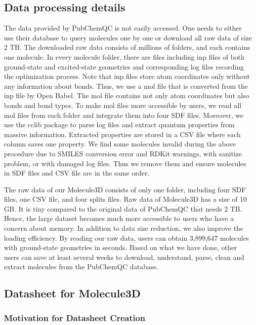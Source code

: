 \documentclass{article}
\begin{document}
\subsection{Data processing details} \label{sec:data_details}
The data provided by PubChemQC is not easily accessed. One needs to either use their database to query molecules one by one or download all raw data of size 2 TB. The downloaded raw data consists of millions of folders, and each contains one molecule. In every molecule folder, there are files including inp files of both ground-state and excited-state geometries and corresponding log files recording the optimization process. Note that inp files store atom coordinates only without any information about bonds. Thus, we use a mol file that is converted from the inp file by Open Babel. The mol file contains not only atom coordinates but also bonds and bond types. To make mol files more accessible by users, we read all mol files from each folder and integrate them into four SDF files. Moreover, we use the cclib package \cite{o2008cclib} to parse log files and extract quantum properties from massive information. Extracted properties are stored in a CSV file where each column saves one property. We find some molecules invalid during the above procedure due to SMILES conversion error and RDKit warnings, with sanitize problem, or with damaged log files. Thus we remove them and ensure molecules in SDF files and CSV file are in the same order.

The raw data of our Molecule3D consists of only one folder, including four SDF files, one CSV file, and four splits files. Raw data of Molecule3D has a size of 10 GB. It is tiny compared to the original data of PubChemQC that needs 2 TB. Hence, the large dataset becomes much more accessible to users who have a concern about memory. In addition to data size reduction, we also improve the loading efficiency. By reading our raw data, users can obtain 3,899,647 molecules with ground-state geometries in seconds. Based on what we have done, other users can save at least several weeks to download, understand, parse, clean and extract molecules from the PubChemQC database. 

\subsection{Datasheet for Molecule3D}

\subsubsection{Motivation for Datasheet Creation}
\end{document}
